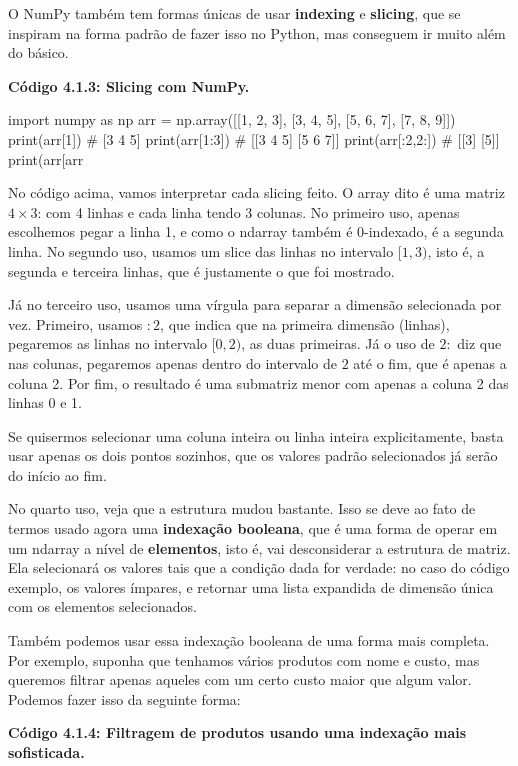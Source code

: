 \documentclass[11pt, a4paper]{article}
\begin{document}
O NumPy também tem formas únicas de usar \textbf{indexing} e \textbf{slicing}, que se inspiram na forma padrão de fazer isso no Python, mas conseguem ir muito além do básico.

\textbf{Código 4.1.3: Slicing com NumPy.}

\begin{code}
import numpy as np
arr = np.array([[1, 2, 3], [3, 4, 5], [5, 6, 7], [7, 8, 9]])
print(arr[1]) # [3 4 5]
print(arr[1:3]) # [[3 4 5] [5 6 7]]
print(arr[:2,2:]) # [[3] [5]]
print(arr[arr%
\end{code}

No código acima, vamos interpretar cada slicing feito. O array dito é uma matriz \(4\times3\): com 4 linhas e cada linha tendo 3 colunas. No primeiro uso, apenas escolhemos pegar a linha 1, e como o ndarray também é 0-indexado, é a segunda linha. No segundo uso, usamos um slice das linhas no intervalo \([1,3)\), isto é, a segunda e terceira linhas, que é justamente o que foi mostrado. 

Já no terceiro uso, usamos uma vírgula para separar a dimensão selecionada por vez. Primeiro, usamos \(:2\), que indica que na primeira dimensão (linhas), pegaremos as linhas no intervalo \([0,2)\), as duas primeiras. Já o uso de \(2:\) diz que nas colunas, pegaremos apenas dentro do intervalo de \(2\) até o fim, que é apenas a coluna 2. Por fim, o resultado é uma submatriz menor com apenas a coluna 2 das linhas 0 e 1. 

Se quisermos selecionar uma coluna inteira ou linha inteira explicitamente, basta usar apenas os dois pontos sozinhos, que os valores padrão selecionados já serão do início ao fim.

No quarto uso, veja que a estrutura mudou bastante. Isso se deve ao fato de termos usado agora uma \textbf{indexação booleana}, que é uma forma de operar em um ndarray a nível de \textbf{elementos}, isto é, vai desconsiderar a estrutura de matriz. Ela selecionará os valores tais que a condição dada for verdade: no caso do código exemplo, os valores ímpares, e retornar uma lista expandida de dimensão única com os elementos selecionados.

Também podemos usar essa indexação booleana de uma forma mais completa. Por exemplo, suponha que tenhamos vários produtos com nome e custo, mas queremos filtrar apenas aqueles com um certo custo maior que algum valor. Podemos fazer isso da seguinte forma:

\textbf{Código 4.1.4: Filtragem de produtos usando uma indexação mais sofisticada.}
\end{document}
